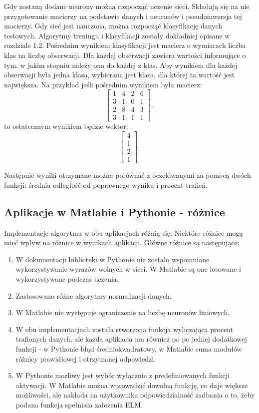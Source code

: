 \documentclass{article}
\begin{document}
Gdy zostaną dodane neurony można rozpocząć uczenie sieci. 
Składają się na nie przygotowanie macierzy na podstawie danych i neuronów i pseudoinwersja tej macierzy. 
Gdy sieć jest nauczona, można rozpocząć klasyfikację danych testowych.
Algorytmy treningu i klasyfikacji zostały dokładniej opisane w rozdziale 1.2.
Pośrednim wynikiem klasyfikacji jest macierz o wymiarach liczba klas na liczbę obserwacji.
Dla każdej obserwacji zawiera wartości informujące o tym, w jakim stopniu należy ona do każdej z klas.
Aby wynikiem dla każdej obserwacji była jedna klasa, wybierana jest klasa, dla której ta wartość jest największa.
Na przykład jeśli pośrednim wynikiem była macierz:
\[ \begin{bmatrix} 1&4&2&6 \\ 3&1&0&1 \\ 2&8&4&3 \\ 3&1&1&1 \end{bmatrix},\]
to ostatecznym wynikiem będzie wektor:
\[ \begin{bmatrix} 4 \\ 1 \\ 2 \\ 1 \end{bmatrix}.\]

Następnie wyniki otrzymane można porównać z oczekiwanymi za pomocą dwóch funkcji: średnia odległość od poprawnego wyniku i procent trafień.

\subsection{Aplikacje w Matlabie i Pythonie - różnice}
\label{porownanie_aplikacji}
Implementacje algorytmu w obu aplikacjach różnią się. 
Niektóre różnice mogą mieć wpływ na różnice w wynikach aplikacji.
Główne różnice są następujące:
\begin{enumerate}
\item W dokumentacji biblioteki w Pythonie nie zostało wspomniane wykorzystywanie wyrazów wolnych w sieci.
W Matlabie są one losowane i wykorzystywane podczas uczenia.
\item Zastosowano różne algorytmy normalizacji danych.
\item W Matlabie nie występuje ograniczenie na liczbę neuronów liniowych.
\item W obu implementacjach została stworzona funkcja wyliczająca procent trafionych danych, ale każda aplikacja ma również po po jednej dodatkowej funkcji - w Pythonie błąd średniokwadratowy, w Matlabie suma modułów różnicy prawidłowej i otrzymanej odpowiedzi.
\item W Pythonie możliwy jest wybór wyłącznie z predefiniowanych funkcji aktywacji. 
W Matlabie można wprowadzić dowolną funkcję, co daje większe możliwości, ale nakłada na użytkownika odpowiedzialność zadbania o to, żeby podana funkcja spełniała założenia ELM.
\end{enumerate}
\end{document}
